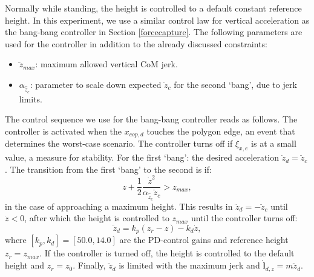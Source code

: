 \documentclass[letterpaper, 10 pt, conference]{ieeeconf}  %
\newcommand{\zmax}{z_{max}}
\newcommand{\rcmpd}{x_{cop,d}}
\newcommand{\icpe}{\xi_{x,e}}
\begin{document}
Normally while standing, the height is controlled to a default constant reference height. In this experiment, we use a similar control law for vertical acceleration as the bang-bang controller in Section \ref{forcecapture}. The following parameters are used for the controller in addition to the already discussed constraints:
\begin{itemize}
	\item $\dddot{z}_{max}$: maximum allowed vertical CoM jerk.
	\item $\alpha_{\hat{\ddot{z}}_{c}}$: parameter to scale down expected $\ddot{z}_c$ for the second `bang', due to jerk limits.
\end{itemize}

The control sequence we use for the bang-bang controller reads as follows. The controller is activated when the $\rcmpd$ touches the polygon edge, an event that determines the worst-case scenario. The controller turns off if $\icpe$ is at a small value, a measure for stability. For the first `bang': the desired acceleration $\ddot{z}_d=\ddot{z}_c$. The transition from the first `bang' to the second is if:
\begin{equation}
	z+\frac{1}{2}\frac{\dot{z}^2}{\alpha_{\hat{\ddot{z}}_{c}}\ddot{z}_{c}} >\zmax,
\end{equation}
in the case of approaching a maximum height. This results in $\ddot{z}_d=-\ddot{z}_c$ until $\dot{z}<0$, after which the height is controlled to $\zmax$ until the controller turns off:
\begin{equation}
	\ddot{z}_d = k_p(z_r-z)-k_d\dot{z},
\end{equation}
where $[k_p,k_d]=[50.0,14.0]$ are the PD-control gains and reference height $z_r= \zmax$. If the controller is turned off, the height is controlled to the default height and $z_r=z_0$. Finally, $\ddot{z}_d$ is limited with the maximum jerk and $\dot{\mathbf{l}}_{d,z}=m\ddot{z}_d$.
\end{document}
